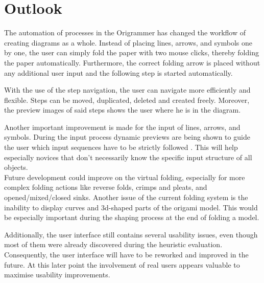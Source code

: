
\section{Outlook}
\label{sec:prospect}

The automation of processes in the Origrammer has changed the workflow of creating diagrams as a whole. Instead of placing lines, arrows, and symbols one by one, the user can simply fold the paper with two mouse clicks, thereby folding the paper automatically. Furthermore, the correct folding arrow is placed without any additional user input and the following step is started automatically.

With the use of the step navigation, the user can navigate more efficiently and flexible. Steps can be moved, duplicated, deleted and created freely. Moreover, the preview images of said steps shows the user where he is in the diagram.

Another important improvement is made for the input of lines, arrows, and symbols. During the input process dynamic previews are being shown to guide the user which input sequences have to be strictly followed . This will help especially novices that don't necessarily know the specific input structure of all objects.\\
\newline
Future development could improve on the virtual folding, especially for more complex folding actions like reverse folds, crimps and pleats, and opened/mixed/closed sinks. Another issue of the current folding system is the inability to display curves and 3d-shaped parts of the origami model. This would be especially important during the shaping process at the end of folding a model.

Additionally, the user interface still contains several usability issues, even though most of them were already discovered during the heuristic evaluation. Consequently, the user interface will have to be reworked and improved in the future. At this later point the involvement of real users appears valuable to maximise usability improvements.
